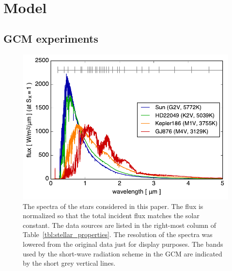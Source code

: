 \documentclass[11pt,numberedappendix,twocolappendix,]{emulateapj}
\begin{document}
\section{Model}
\label{s:model}

\subsection{GCM experiments}

\begin{figure}[!bh]
    \begin{center}
    \includegraphics[width=\hsize]{star_spectra.pdf}
    \end{center}
\caption{The spectra of the stars considered in this paper. The flux is normalized so that the total incident flux matches the solar constant. The data sources are listed in the right-most column of Table~\ref{tbl:stellar_properties}. The resolution of the spectra was lowered from the original data just for display purposes. The bands used by the short-wave radiation scheme in the GCM are indicated by the short grey vertical lines.}
\label{fig:star_spectra}
\end{figure}
\end{document}
